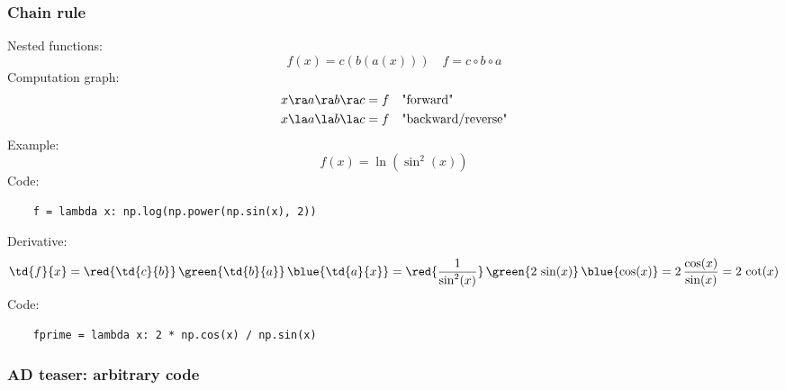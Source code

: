 \documentclass[fleqn,10pt]{beamer}
\begin{document}
\begin{frame}[fragile]
    \frametitle{Chain rule}
    Nested functions:
    \begin{equation*}
        f(x) = c(b(a(x)))\quad f = c \circ b \circ a
    \end{equation*}
    Computation graph:
    \begin{align*}
        x\ra a\ra b\ra c &= f\quad\text{"forward"}\\
        x\la a\la b\la c &= f\quad\text{"backward/reverse"}
    \end{align*}
    Example:
    \begin{equation*}
        f(x) = \ln(\sin^2(x))
    \end{equation*}
    Code:
    \begin{verbatim}
    f = lambda x: np.log(np.power(np.sin(x), 2))
    \end{verbatim}
    Derivative:
    \begin{equation*}
        \td{f}{x} = \red{\td{c}{b}}\,\green{\td{b}{a}}\,\blue{\td{a}{x}}
            = \red{\frac{1}{\sin^2(x)}}\,\green{2\,\sin(x)}\,\blue{\cos(x)}
            = 2\,\frac{\cos(x)}{\sin(x)} = 2\,\cot(x)
    \end{equation*}
    Code:
    \begin{verbatim}
    fprime = lambda x: 2 * np.cos(x) / np.sin(x)
    \end{verbatim}
\end{frame}


\begin{frame}
    \frametitle{AD teaser: arbitrary code}
    \vspace{-0.3cm}
\end{frame}
\end{document}
